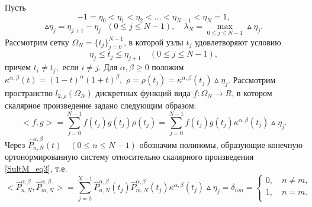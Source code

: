 Пусть
\begin{equation}
\label{SultM_eq1}
-1=\eta_{0}<\eta_{1}<\eta_{2}<\dots<\eta_{N-1}<\eta_{N}=1,
\end{equation}
\begin{equation*}
\vartriangle\eta_{j} = \eta_{j+1}-\eta_{j}\text{ } (0 \leq j \leq N-1), \quad \lambda_N = \max_{0\leq j \leq N-1} \vartriangle\eta_j.
\end{equation*}
Рассмотрим сетку $\Omega_N = \{ t_j \}_{j=0}^{N-1}$, в которой узлы $t_j$ удовлетворяют условию
\begin{equation}
\label{SultM_eq2}
\eta_{j}\leq t_{j} \leq \eta_{j+1} \quad (0\leq j \leq N-1),
\end{equation}
причем $t_i \neq t_j,$ если $i \neq j$. Для $\alpha,\beta \geq 0$ положим $\kappa^{\alpha,\beta}(t) = (1-t)^\alpha (1+t)^\beta,$ $\rho = \rho(t_j)=\kappa^{\alpha,\beta}(t_j)\vartriangle\eta_{j}$.
Рассмотрим пространство $l_{2,\rho}(\Omega_N)$ дискретных функций вида $f:\Omega_N \rightarrow R$, в котором скалярное произведение задано следующим образом:
\begin{equation}
\label{SultM_eq3}
<f,g> = \sum_{j=0}^{N-1} f(t_j)g(t_j)\rho(t_j) = \sum_{j=0}^{N-1} f(t_j)g(t_j) \kappa^{\alpha,\beta}(t_j)\vartriangle\eta_{j}.
\end{equation}
Через $\hat{P}_{n,N}^{\alpha,\beta}(t) \quad (0 \leq n \leq N-1)$ обозначим полиномы, образующие конечную ортонормированную систему относительно скалярного произведения \eqref{SultM_eq3}, т.е.
\begin{equation*}
<\hat{P}_{n,N}^{\alpha,\beta},\hat{P}_{m,N}^{\alpha,\beta}> = \sum_{j=0}^{N-1} \hat{P}_{n,N}^{\alpha,\beta}(t_j)\hat{P}_{m,N}^{\alpha,\beta}(t_j) \kappa^{\alpha,\beta}(t_j)\vartriangle\eta_{j} = \delta_{nm} =
\left\{
\begin{aligned}
0, \quad n \neq m,\\
1, \quad n = m.\\
\end{aligned}
\right.
\end{equation*}

